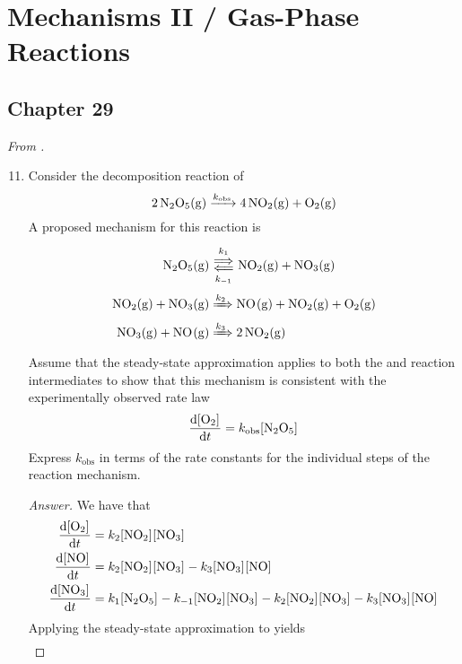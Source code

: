 \documentclass[../psets.tex]{subfiles}
\begin{document}
\section{Mechanisms II / Gas-Phase Reactions}
\subsection*{Chapter 29}
\emph{From \textcite{bib:McQuarrieSimon}.}
\begin{enumerate}[label={\textbf{29-\arabic*.}},leftmargin=3.5em]
    \setcounter{enumi}{10}
    \item {}Consider the decomposition reaction of 
    \begin{equation*}
        \ce{2N2O5(g) ->[$k_\text{obs}$] 4NO2(g) + O2(g)}
    \end{equation*}
    A proposed mechanism for this reaction is
    \begin{align*}
        \ce{N2O5(g)} &\Longleftrightarrows[k_1][k_{-1}] \ce{NO2(g) + NO3(g)}\\
        \ce{NO2(g) + NO3(g)} &\xRightarrow{k_2} \ce{NO(g) + NO2(g) + O2(g)}\\
        \ce{NO3(g) + NO(g)} &\xRightarrow{k_3} \ce{2NO2(g)}
    \end{align*}
    Assume that the steady-state approximation applies to both the  and  reaction intermediates to show that this mechanism is consistent with the experimentally observed rate law
    \begin{equation*}
        \dv{\cnc{O2}}{t} = k_\text{obs}\cnc{N2O5}
    \end{equation*}
    Express $k_\text{obs}$ in terms of the rate constants for the individual steps of the reaction mechanism.
    \begin{proof}[Answer]
        We have that
        \begin{align*}
            \dv{\cnc{O2}}{t} &= k_2\cnc{NO2}\cnc{NO3}\\
            \dv{\cnc{NO}}{t} &= k_2\cnc{NO2}\cnc{NO3}-k_3\cnc{NO3}\cnc{NO}\\
            \dv{\cnc{NO3}}{t} &= k_1\cnc{N2O5}-k_{-1}\cnc{NO2}\cnc{NO3}-k_2\cnc{NO2}\cnc{NO3}-k_3\cnc{NO3}\cnc{NO}
        \end{align*}
        Applying the steady-state approximation to  yields
        \begin{align*}

\end{align*}
\end{proof}
\end{enumerate}
\end{document}
